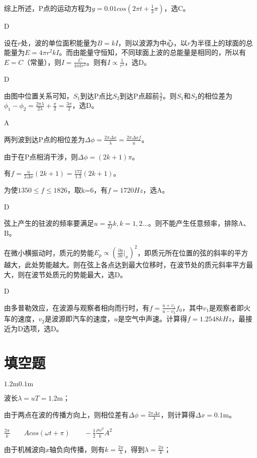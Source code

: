 综上所述，P点的运动方程为$y=0.01cos(2\pi t+\frac{1}{3}\pi)$，选C。

\exercise D

\solve  设在$r$处，波的单位面积能量为$B=kI$，则以波源为中心，以$r$为半径上的球面的总能量为$E=4\pi r^2 kI$。而由能量守恒知，不同球面上波的总能量是相同的，所以有$E=C$（常量），则$I=\frac{C}{4\pi k r^2}$。则有$I\propto \frac{1}{r^2}$，选D。

\exercise D

\solve 由图中位置关系可知，$S_1$到达P点比$S_2$到达P点超前$\frac{\lambda}{2}$。则$S_1$和$S_2$的相位差为$\phi_1-\phi_2=\frac{ 2\pi\lambda}{2 \lambda}+\frac{\pi}{2}=\frac{3\pi}{2}$，选D。 

\exercise A

\solve 两列波到达P点的相位差为$\Delta\phi=\frac{2\pi\Delta x}{\lambda}=\frac{2\pi\Delta x f}{u}$。

由于在P点相消干涉，则$\Delta\phi=(2k+1)\pi$。

有$f=\frac{u}{2\Delta x}(2k+1)=\frac{172}{1.3}(2k+1)$。

为使$1350\leqslant f \leqslant 1826$，取k=6，有$f=1720Hz$，选A。

\exercise D

\solve 弦上产生的驻波的频率要满足$u=\frac{u}{2f}k,k=1,2\ldots$。则不能产生任意频率，排除A、B。

在微小横振动时，质元的势能$E_p\propto (\frac{\partial y}{\partial x}|_x)^2$，即质元所在位置的弦的斜率的平方越大，此处势能越大。则在弦上各点达到最大位移时，在波节处的质元斜率平方最大，则在波节处质元的势能最大，选D。

\exercise D

\solve 由多普勒效应，在波源与观察者相向而行时，有$f=\frac{u+v_1}{u-v_2}f_0$，其中$v_1$是观察者即火车的速度，$v_2$是波源即汽车的速度，$u$是空气中声速。计算得$f=1.2548kHz$，最接近为D选项，选D。

\section{填空题}
\exercise $1.2\mathrm{m}$\qquad$0.1\mathrm{m}$

\solve 波长$\lambda=uT=1.2\mathrm{m}$；

由于两点在波的传播方向上，则相位差有$\Delta \phi=\frac{2\pi \Delta x}{\lambda}$，则计算得$\Delta x=0.1\mathrm{m}$。

\exercise $\frac{2\pi}{k}\qquad Acos(\omega t+\pi)\qquad -\frac{1}{2}\frac{\rho \omega^3}{k}A^2$

\solve 由于机械波向$x$轴负向传播，则有$k=\frac{2\pi}{\lambda}$，得到$\lambda=\frac{2\pi}{k}$；

